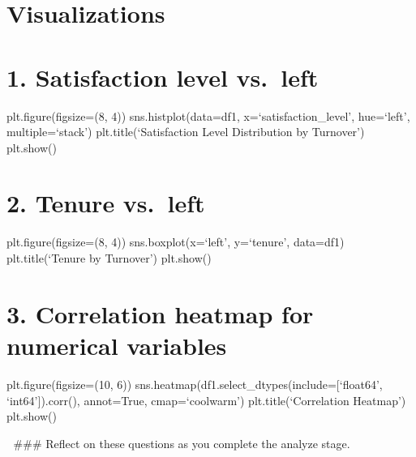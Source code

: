 \documentclass[11pt]{article}
\begin{document}
\hypertarget{visualizations}{%
\section{Visualizations}\label{visualizations}}

\hypertarget{satisfaction-level-vs.-left}{%
\section{1. Satisfaction level
vs.~left}\label{satisfaction-level-vs.-left}}

plt.figure(figsize=(8, 4)) sns.histplot(data=df1,
x=`satisfaction\_level', hue=`left', multiple=`stack')
plt.title(`Satisfaction Level Distribution by Turnover') plt.show()

\hypertarget{tenure-vs.-left}{%
\section{2. Tenure vs.~left}\label{tenure-vs.-left}}

plt.figure(figsize=(8, 4)) sns.boxplot(x=`left', y=`tenure', data=df1)
plt.title(`Tenure by Turnover') plt.show()

\hypertarget{correlation-heatmap-for-numerical-variables}{%
\section{3. Correlation heatmap for numerical
variables}\label{correlation-heatmap-for-numerical-variables}}

plt.figure(figsize=(10, 6))
sns.heatmap(df1.select\_dtypes(include={[}`float64', `int64'{]}).corr(),
annot=True, cmap=`coolwarm') plt.title(`Correlation Heatmap') plt.show()

    💭 \#\#\# Reflect on these questions as you complete the analyze stage.
\end{document}

